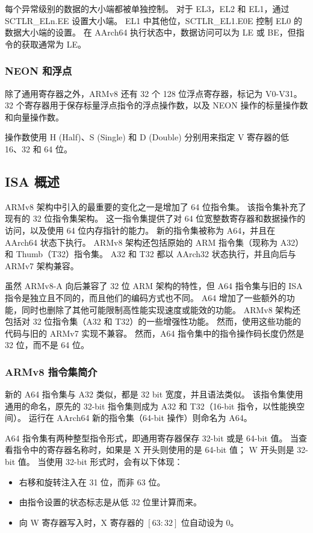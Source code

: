 
每个异常级别的数据的大小端都被单独控制。
对于 EL3，EL2 和 EL1，通过 SCTLR\_ELn.EE 设置大小端。
EL1 中其他位，SCTLR\_EL1.E0E 控制 EL0 的数据大小端的设置。
在 AArch64 执行状态中，数据访问可以为 LE 或 BE，但指令的获取通常为 LE。

\subsubsection{NEON 和浮点}

除了通用寄存器之外，ARMv8 还有 32 个 128 位浮点寄存器，标记为 V0-V31。
32 个寄存器用于保存标量浮点指令的浮点操作数，以及 NEON 操作的标量操作数和向量操作数。

操作数使用 H (Half)、S (Single) 和 D (Double) 分别用来指定 V 寄存器的低 16、32 和 64 位。

\subsection{ISA 概述}

ARMv8 架构中引入的最重要的变化之一是增加了 64 位指令集。
该指令集补充了现有的 32 位指令集架构。
这一指令集提供了对 64 位宽整数寄存器和数据操作的访问，以及使用 64 位内存指针的能力。
新的指令集被称为 A64，并且在 AArch64 状态下执行。
ARMv8 架构还包括原始的 ARM 指令集（现称为 A32）和 Thumb（T32）指令集。
A32 和 T32 都以 AArch32 状态执行，并且向后与 ARMv7 架构兼容。

虽然 ARMv8-A 向后兼容了 32 位 ARM 架构的特性，但 A64 指令集与旧的 ISA 指令是独立且不同的，而且他们的编码方式也不同。
A64 增加了一些额外的功能，同时也删除了其他可能限制高性能实现速度或能效的功能。
ARMv8 架构还包括对 32 位指令集（A32 和 T32）的一些增强性功能。
然而，使用这些功能的代码与旧的 ARMv7 实现不兼容。
然而，A64 指令集中的指令操作码长度仍然是 32 位，而不是 64 位。

\subsubsection{ARMv8 指令集简介}

新的 A64 指令集与 A32 类似，都是 32 bit 宽度，并且语法类似。
该指令集使用通用的命名，原先的 32-bit 指令集则成为 A32 和 T32（16-bit 指令，以性能换空间）。
运行在 AArch64 新的指令集（64-bit 操作）则命名为 A64。

A64 指令集有两种整型指令形式，即通用寄存器保存 32-bit 或是 64-bit 值。
当查看指令中的寄存器名称时，如果是 X 开头则使用的是 64-bit 值；
W 开头则是 32-bit 值。
当使用 32-bit 形式时，会有以下体现：
\begin{itemize}
  \item 右移和旋转注入在 31 位，而非 63 位。
  \item 由指令设置的状态标志是从低 32 位里计算而来。
  \item 向 W 寄存器写入时，X 寄存器的 $[63:32]$ 位自动设为 0。
\end{itemize}

